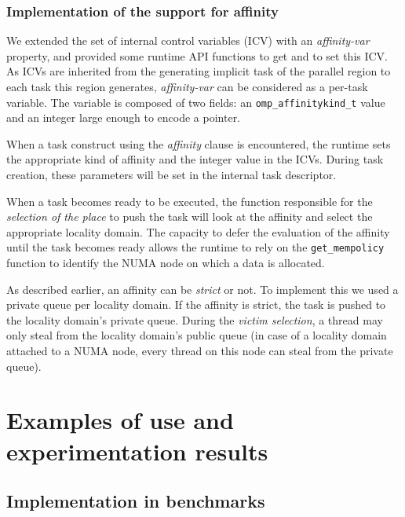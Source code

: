 \documentclass{Styles/llncs}
\newcommand{\TG}[1]{{\color{red}\bfseries TG: #1}}
\begin{document}
\subsubsection{Implementation of the support for affinity}
We extended the set of internal control variables (ICV) with an \textit{affinity-var} property, and provided some runtime API functions to get and to set this ICV. As ICVs are inherited from the generating implicit task of the parallel region to each task this region generates, \textit{affinity-var} can be considered as a per-task variable. The variable is composed of two fields: an \texttt{omp\_affinitykind\_t} value and an integer large enough to encode a pointer.


When a task construct using the \textit{affinity} clause is encountered, the runtime sets the appropriate kind of affinity and the integer value in the ICVs.
During task creation, these parameters will be set in the internal task descriptor.

When a task becomes ready to be executed, the function responsible for the \textit{selection of the place} to push
the task will look at the affinity and select the appropriate locality domain. The capacity to defer the evaluation of the affinity until the task becomes ready allows the runtime to rely on the \verb/get_mempolicy/ function to identify the NUMA node on which a data is allocated.

As described earlier, an affinity can be \emph{strict} or not. To implement this we used
a private queue per locality domain. If the affinity is strict, the task is pushed to the locality domain's private queue.
During the \textit{victim selection}, a thread may only steal from the locality domain's
public queue (in case of a locality domain attached to a NUMA node, every thread on this node can steal from the private queue).

\section{Examples of use and experimentation results}

\subsection{Implementation in benchmarks}
\end{document}
